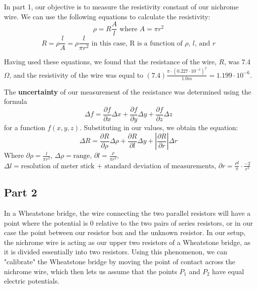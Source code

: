 \documentclass[titlepage]{article}
\begin{document}
    In part 1, our objective is to measure the resistivity constant of our nichrome wire. We can use the following equations to calculate the resistivity:
    $$\rho = R \frac{A}{l} \text{ where } A=\pi r^2$$ 
    $$ R=\rho \frac{l}{A} = \rho \frac{l}{\pi r^2}  \text{ in this case, R is a function of $\rho$, $l$, and $r$} $$

    Having used these equations, we found that the resistance of the wire, $R$, was 7.4$\Omega$, and the resistivity of the wire was equal to $(7.4)\frac{\pi \cdot (0.227 \cdot 10^{-3})^2}{1.0m} = 1.199\cdot 10^{-6}$. 

    The \textbf{uncertainty} of our measurement of the resistance was determined using the formula $$\Delta f= \frac{\partial f}{\partial x} \Delta x + \frac{\partial f}{\partial y} \Delta y + \frac{\partial f}{\partial z} \Delta z$$ for a function $f(x,y,z)$.
    Substituting in our values, we obtain the equation:
    $$\Delta R= \frac{\partial R}{\partial \rho} \Delta \rho + \frac{\partial R}{\partial l} \Delta y + \left|\frac{\partial R}{\partial r}\right| \Delta r$$ 
    Where $\partial \rho = \frac{l}{\pi r^2}$, $\Delta \rho = \text{range}$, $\partial l = \frac{\rho}{\pi r^2}$, $\Delta l =\text{resolution of meter stick + standard deviation of measurements}$, $\partial r = \frac{\rho l}{\pi}\cdot \frac{-2}{r^3}$ 
    
    


        \subsection{Part 2} 
        In a Wheatstone bridge, the wire connecting the two parallel resistors will have a point where the potential is 0 relative to the two pairs of series resistors, or in our case the point between our resistor box and the unknown resistor. In our setup, the nichrome wire is acting as our upper two resistors of a Wheatstone bridge, as it is divided essentially into two resistors. Using this phenomenon, we can "calibrate" the Wheatstone bridge by moving the point of contact across the nichrome wire, which then lets us assume that the points $P_1$ and $P_2$ have equal electric potentials. 
\end{document}
